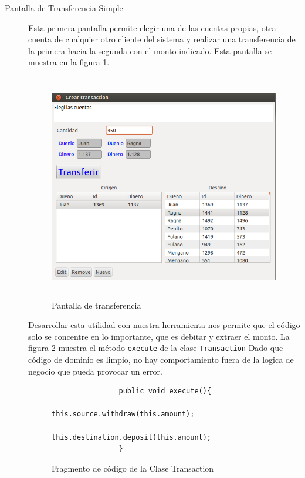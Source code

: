 \begin{description}

	\item[Pantalla de Transferencia Simple]
		Esta primera pantalla permite elegir una de las cuentas propias, otra cuenta
		de cualquier otro cliente del sistema y realizar una transferencia de la
		primera hacia la segunda con el monto indicado. Esta pantalla se
		muestra en la figura \ref{trasferenciaSimple}.
		
		\begin{figure}[h]
			\centering
			\includegraphics[width=450px, height=375px]{img/simple-transferencia}
			\caption{Pantalla de transferencia}
			\label{trasferenciaSimple}
		\end{figure}

		Desarrollar esta utilidad con nuestra herramienta nos permite que el código
		solo se concentre en lo importante, que es debitar y extraer el monto. %
		La figura \ref{executeTransaction} muestra el método  \lstinline|execute| de la
		clase \lstinline|Transaction| 
		Dado que código de dominio es limpio, no hay comportamiento fuera de la logica
		de negocio que pueda provocar un error.

		\begin{figure}[h]
			\begin{lstlisting}
				public void execute(){
					this.source.withdraw(this.amount);
					this.destination.deposit(this.amount);
				}
			\end{lstlisting}
			\caption{Fragmento de código de la Clase Transaction}
			\label{executeTransaction}
		\end{figure}
		 

\end{description}
